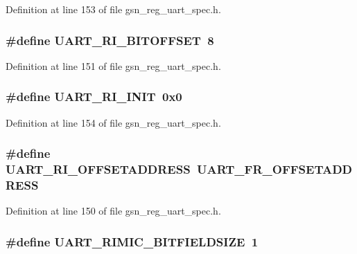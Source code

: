 Definition at line 153 of file gsn\_\-reg\_\-uart\_\-spec.h.

\hypertarget{a00575_a3c027409e7ebbc51bc2b17dec54830dd}{
\subsubsection[{UART\_\-RI\_\-BITOFFSET}]{\setlength{\rightskip}{0pt plus 5cm}\#define UART\_\-RI\_\-BITOFFSET~8}}
\label{a00575_a3c027409e7ebbc51bc2b17dec54830dd}


Definition at line 151 of file gsn\_\-reg\_\-uart\_\-spec.h.

\hypertarget{a00575_acadd1eb0915272c47cf080c968b84084}{
\subsubsection[{UART\_\-RI\_\-INIT}]{\setlength{\rightskip}{0pt plus 5cm}\#define UART\_\-RI\_\-INIT~0x0}}
\label{a00575_acadd1eb0915272c47cf080c968b84084}


Definition at line 154 of file gsn\_\-reg\_\-uart\_\-spec.h.

\hypertarget{a00575_a4c3fcf61de69f09603382161109f5fd8}{
\subsubsection[{UART\_\-RI\_\-OFFSETADDRESS}]{\setlength{\rightskip}{0pt plus 5cm}\#define UART\_\-RI\_\-OFFSETADDRESS~UART\_\-FR\_\-OFFSETADDRESS}}
\label{a00575_a4c3fcf61de69f09603382161109f5fd8}


Definition at line 150 of file gsn\_\-reg\_\-uart\_\-spec.h.

\hypertarget{a00575_ae88a59d372401269fd485f863e0c8373}{
\subsubsection[{UART\_\-RIMIC\_\-BITFIELDSIZE}]{\setlength{\rightskip}{0pt plus 5cm}\#define UART\_\-RIMIC\_\-BITFIELDSIZE~1}}
\label{a00575_ae88a59d372401269fd485f863e0c8373}


